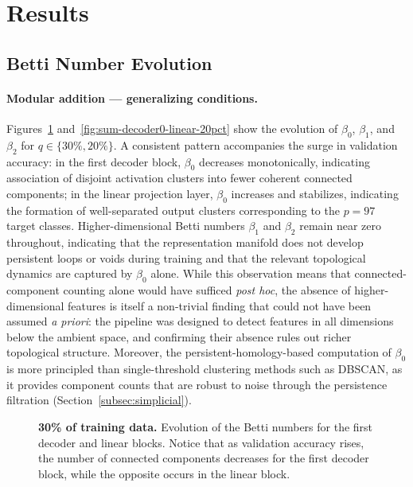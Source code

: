 \section{Results}
\label{sec:results}

\subsection{Betti Number Evolution}
\label{subsec:results_betti}

\paragraph{Modular addition — generalizing conditions.}
Figures~\ref{fig:sum-decoder0-linear-30pct} and~\ref{fig:sum-decoder0-linear-20pct} show the evolution of $\beta_0$, $\beta_1$, and $\beta_2$ for $q \in \{30\%, 20\%\}$. A consistent pattern accompanies the surge in validation accuracy: in the first decoder block, $\beta_0$ decreases monotonically, indicating association of disjoint activation clusters into fewer coherent connected components; in the linear projection layer, $\beta_0$ increases and stabilizes, indicating the formation of well-separated output clusters corresponding to the $p = 97$ target classes. Higher-dimensional Betti numbers $\beta_1$ and $\beta_2$ remain near zero throughout, indicating that the representation manifold does not develop persistent loops or voids during training and that the relevant topological dynamics are captured by $\beta_0$ alone. While this observation means that connected-component counting alone would have sufficed \emph{post hoc}, the absence of higher-dimensional features is itself a non-trivial finding that could not have been assumed \emph{a priori}: the pipeline was designed to detect features in all dimensions below the ambient space, and confirming their absence rules out richer topological structure. Moreover, the persistent-homology-based computation of $\beta_0$ is more principled than single-threshold clustering methods such as DBSCAN, as it provides component counts that are robust to noise through the persistence filtration (Section~\ref{subsec:simplicial}).

\begin{figure}
    
    
    \caption[30\% of training data.]{\textbf{30\% of training data.} Evolution of the Betti numbers for the first decoder and linear blocks. Notice that as validation accuracy rises, the number of connected components decreases for the first decoder block, while the opposite occurs in the linear block.}
    \label{fig:sum-decoder0-linear-30pct}
\end{figure}

